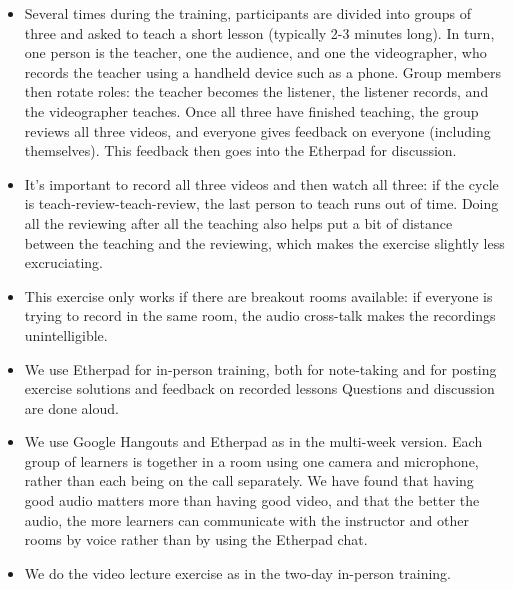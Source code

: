 \begin{itemize}
\item
  Several times during the training, participants are divided into
  groups of three and asked to teach a short lesson (typically 2-3
  minutes long). In turn, one person is the teacher, one the audience,
  and one the videographer, who records the teacher using a handheld
  device such as a phone. Group members then rotate roles: the teacher
  becomes the listener, the listener records, and the videographer
  teaches. Once all three have finished teaching, the group reviews all
  three videos, and everyone gives feedback on everyone (including
  themselves). This feedback then goes into the Etherpad for discussion.
\item
  It's important to record all three videos and then watch all three: if
  the cycle is teach-review-teach-review, the last person to teach runs
  out of time. Doing all the reviewing after all the teaching also helps
  put a bit of distance between the teaching and the reviewing, which
  makes the exercise slightly less excruciating.
\item
  This exercise only works if there are breakout rooms available: if
  everyone is trying to record in the same room, the audio cross-talk
  makes the recordings unintelligible.
\item
  We use Etherpad for in-person training, both for note-taking and for
  posting exercise solutions and feedback on recorded lessons Questions
  and discussion are done aloud.
\end{itemize}


\begin{itemize}
\item
  We use Google Hangouts and Etherpad as in the multi-week version. Each
  group of learners is together in a room using one camera and
  microphone, rather than each being on the call separately. We have
  found that having good audio matters more than having good video, and
  that the better the audio, the more learners can communicate with the
  instructor and other rooms by voice rather than by using the Etherpad
  chat.
\item
  We do the video lecture exercise as in the two-day in-person training.
\end{itemize}


